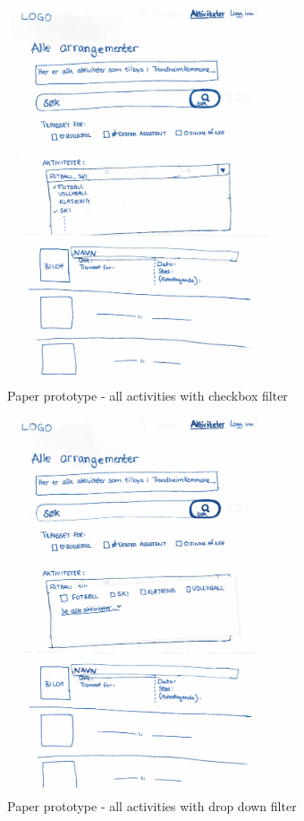 \begin{figure}[H]
\centering
    \includegraphics[width=0.7\textwidth]{fig/PaperPrototype/All_activities_1.pdf}
\caption{Paper prototype - all activities with checkbox filter}
\label{All_Activities_1}
\end{figure}

\begin{figure}[H]
\centering
    \includegraphics[width=0.7\textwidth]{fig/PaperPrototype/All_activities_3.pdf}
\caption{Paper prototype - all activities with drop down filter}
\label{All_Activities_3}
\end{figure}

\cleardoublepage